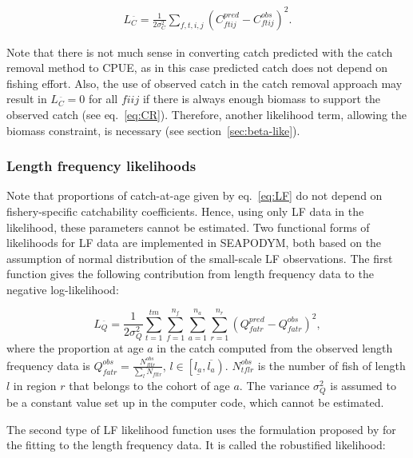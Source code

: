 \begin{align*}\label{eq:C-like-normal}
L_{\scriptscriptstyle  C}^{\bar{\text{ }}} = \frac{1}{2\sigma^2_C}\sum_{f,t,i,j}\left(C^{pred}_{ftij}-C^{obs}_{ftij}\right)^2.
\end{align*} 

Note that there is not much sense in converting catch predicted with the catch removal method to CPUE, as in this case predicted catch does not depend on fishing effort. Also, the use of observed catch in the catch removal approach may result in $L_{\scriptscriptstyle  C}^{\bar{\text{ }}}=0$ for all $fiij$ if there is always enough biomass to support the observed catch (see eq.~\ref{eq:CR}). Therefore, another likelihood term, allowing the biomass constraint, is necessary (see section~\ref{sec:beta-like}). 

\subsubsection{Length frequency likelihoods}\label{sec:lf-like}

Note that proportions of catch-at-age given by eq.~\ref{eq:LF} do not depend on fishery-specific catchability coefficients. Hence, using only LF data in the likelihood, these parameters cannot be estimated. Two functional forms of likelihoods for LF data are implemented in SEAPODYM, both based on the assumption of normal distribution of the small-scale LF observations. The first function gives the following contribution from length frequency data to the negative log-likelihood:

\begin{equation}\label{eq:lf-like1}
L_{\scriptscriptstyle  Q}^{\bar{\text{ }}} = \frac{1}{2\sigma^2_Q}\sum\limits^{tm}_{t=1}\sum\limits^{n_f}_{f=1}\sum\limits^{n_a}_{a=1}\sum\limits^{n_r}_{r=1}
\left(Q^{pred}_{fatr}-Q^{obs}_{fatr}\right)^2,
\end{equation} 
\noindent where the proportion at age $a$ in the catch computed from the observed length frequency data is $Q^{obs}_{fatr}=\frac{N^{obs}_{fltr}}{\sum_l N_{fltr}}$, $l \in \left[\underline{l_a},\overline{l_a}\right)$. $N^{obs}_{tflr}$ is the number of fish of length $l$ in region $r$ that belongs to the cohort of age $a$. The variance $\sigma^2_Q$ is assumed to be a constant value set up in the computer code, which cannot be estimated.

The second type of LF likelihood function uses the formulation proposed by \citet{Hampton-Fournier} for the fitting to the length frequency data. It is called the robustified likelihood:

